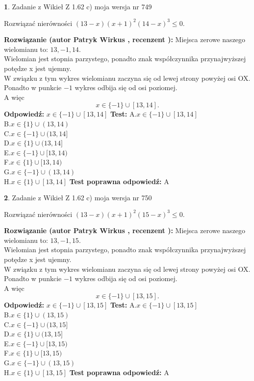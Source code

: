 \documentclass[12pt, a4paper]{article}
\theoremstyle{definition} %
\newtheorem{zad}{}
\newcommand{\zadStart}[1]{\begin{zad}#1\newline}
\newcommand{\zadStop}{\end{zad}}
\newcommand{\rozwStart}[2]{\noindent \textbf{Rozwiązanie (autor #1 , recenzent #2): }\newline}
\newcommand{\rozwStop}{\newline}
\newcommand{\odpStart}{\noindent \textbf{Odpowiedź:}\newline}
\newcommand{\odpStop}{\newline}
\newcommand{\testStart}{\noindent \textbf{Test:}\newline}
\newcommand{\testStop}{\newline}
\newcommand{\kluczStart}{\noindent \textbf{Test poprawna odpowiedź:}\newline}
\newcommand{\kluczStop}{\newline}
\begin{document}
\zadStart{Zadanie z Wikieł Z 1.62 c) moja wersja nr 749}

Rozwiązać nierówności $(13-x)(x+1)^{2}(14-x)^{3}\le0$.
\zadStop
\rozwStart{Patryk Wirkus}{}
Miejsca zerowe naszego wielomianu to: $13, -1, 14$.\\
Wielomian jest stopnia parzystego, ponadto znak współczynnika przy\linebreak najwyższej potędze x jest ujemny.\\ W związku z tym wykres wielomianu zaczyna się od lewej strony powyżej osi OX.\\
Ponadto w punkcie $-1$ wykres odbija się od osi poziomej.\\
A więc $$x \in \{-1\} \cup [13,14].$$
\rozwStop
\odpStart
$x \in \{-1\} \cup [13,14]$
\odpStop
\testStart
A.$x \in \{-1\} \cup [13,14]$\\
B.$x \in \{1\} \cup (13,14)$\\
C.$x \in \{-1\} \cup (13,14]$\\
D.$x \in \{1\} \cup (13,14]$\\
E.$x \in \{-1\} \cup [13,14)$\\
F.$x \in \{1\} \cup [13,14)$\\
G.$x \in \{-1\} \cup (13,14)$\\
H.$x \in \{1\} \cup [13,14]$
\testStop
\kluczStart
A
\kluczStop



\zadStart{Zadanie z Wikieł Z 1.62 c) moja wersja nr 750}

Rozwiązać nierówności $(13-x)(x+1)^{2}(15-x)^{3}\le0$.
\zadStop
\rozwStart{Patryk Wirkus}{}
Miejsca zerowe naszego wielomianu to: $13, -1, 15$.\\
Wielomian jest stopnia parzystego, ponadto znak współczynnika przy\linebreak najwyższej potędze x jest ujemny.\\ W związku z tym wykres wielomianu zaczyna się od lewej strony powyżej osi OX.\\
Ponadto w punkcie $-1$ wykres odbija się od osi poziomej.\\
A więc $$x \in \{-1\} \cup [13,15].$$
\rozwStop
\odpStart
$x \in \{-1\} \cup [13,15]$
\odpStop
\testStart
A.$x \in \{-1\} \cup [13,15]$\\
B.$x \in \{1\} \cup (13,15)$\\
C.$x \in \{-1\} \cup (13,15]$\\
D.$x \in \{1\} \cup (13,15]$\\
E.$x \in \{-1\} \cup [13,15)$\\
F.$x \in \{1\} \cup [13,15)$\\
G.$x \in \{-1\} \cup (13,15)$\\
H.$x \in \{1\} \cup [13,15]$
\testStop
\kluczStart
A
\kluczStop
\end{document}
